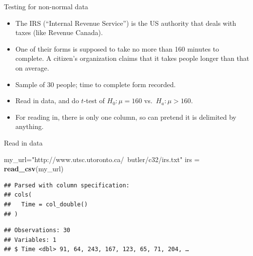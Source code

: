 \documentclass[
  ignorenonframetext,
]{beamer}
\newenvironment{Shaded}{\begin{snugshade}}{\end{snugshade}}
\newcommand{\KeywordTok}[1]{\textcolor[rgb]{0.13,0.29,0.53}{\textbf{#1}}}
\newcommand{\NormalTok}[1]{#1}
\newcommand{\OperatorTok}[1]{\textcolor[rgb]{0.81,0.36,0.00}{\textbf{#1}}}
\newcommand{\StringTok}[1]{\textcolor[rgb]{0.31,0.60,0.02}{#1}}
\providecommand{\tightlist}{%
  \setlength{\itemsep}{0pt}\setlength{\parskip}{0pt}}
\begin{document}
\begin{frame}{Testing for non-normal data}
\protect\hypertarget{testing-for-non-normal-data}{}

\begin{itemize}
\tightlist
\item
  The IRS (``Internal Revenue Service'') is the US authority that deals
  with taxes (like Revenue Canada).
\item
  One of their forms is supposed to take no more than 160 minutes to
  complete. A citizen's organization claims that it takes people longer
  than that on average.
\item
  Sample of 30 people; time to complete form recorded.
\item
  Read in data, and do \(t\)-test of \(H_0 : \mu = 160\)
  vs.~\(H_a : \mu > 160\).
\item
  For reading in, there is only one column, so can pretend it is
  delimited by anything.
\end{itemize}

\end{frame}

\begin{frame}[fragile]{Read in data}
\protect\hypertarget{read-in-data}{}

\begin{Shaded}
\begin{Highlighting}[]
\NormalTok{my_url=}\StringTok{"http://www.utsc.utoronto.ca/~butler/c32/irs.txt"}
\NormalTok{irs =}\StringTok{ }\KeywordTok{read_csv}\NormalTok{(my_url)}
\end{Highlighting}
\end{Shaded}

\begin{verbatim}
## Parsed with column specification:
## cols(
##   Time = col_double()
## )
\end{verbatim}

\begin{Shaded}
\end{Shaded}

\begin{verbatim}
## Observations: 30
## Variables: 1
## $ Time <dbl> 91, 64, 243, 167, 123, 65, 71, 204, …
\end{verbatim}

\end{frame}
\end{document}
